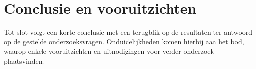 \section{Conclusie en vooruitzichten}
\label{sec:conclusie-en-vooruitzichten}
Tot slot volgt een korte conclusie met een terugblik op de resultaten ter antwoord op de gestelde onderzoeksvragen.
Onduidelijkheden komen hierbij aan het bod, waarop enkele vooruitzichten en uitnodigingen voor verder onderzoek plaatsvinden.